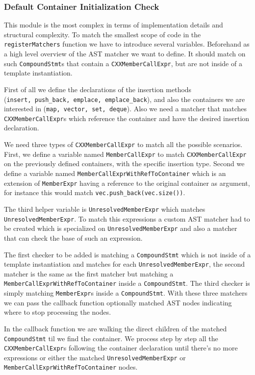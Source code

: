 \subsubsection{Default Container Initialization Check}
\par This module is the most complex in terms of implementation details and structural complexity. To match the smallest scope of code in the \verb|registerMatchers| function we have to introduce several variables. Beforehand as a high level overview of the AST matcher we want to define. It should match on such \verb|CompoundStmt|s that contain a \verb|CXXMemberCallExpr|, but are not inside of a template instantiation. \medskip
\par First of all we define the declarations of the insertion methods \\(\verb|insert, push_back, emplace, emplace_back|), and also the containers we are interested in (\verb|map, vector, set, deque|). Also we need a matcher that matches \verb|CXXMemberCallExpr|s which reference the container and have the desired insertion declaration. \medskip
\par We need three types of \verb|CXXMemberCallExpr| to match all the possible scenarios. First, we define a variable named \verb|MemberCallExpr| to match \verb|CXXMemberCallExpr| on the previously defined containers, with the specific insertion type. Second we define a variable named \verb|MemberCallExprWithRefToContainer| which is an extension of \verb|MemberExpr| having a reference to the original container as argument, for instance this would match \verb|vec.push_back(vec.size())|. \medskip 
\par The third helper variable is \verb|UnresolvedMemberExpr| which matches \verb|UnresolvedMemberExpr|. To match this expressions a custom AST matcher had to be created which is specialized on \verb|UnresolvedMemberExpr| and also a matcher that can check the base of such an expression. \medskip
\par The first checker to be added is matching a \verb|CompoundStmt| which is not inside of a template instantiation and matches for each \verb|UnresolvedMemberExpr|, the second matcher is the same as the first matcher but matching a \verb|MemberCallExprWithRefToContainer| inside a \verb|CompoundStmt|. The third checker is simply matching \verb|MemberExpr|s inside a \verb|CompoundStmt|. With these three matchers we can pass the callback function optionally matched AST nodes indicating where to stop processing the nodes. \medskip
\par In the callback function we are walking the direct children of the matched \verb|CompoundStmt| til we find the container. We process step by step all the \verb|CXXMemberCallExpr|s following the container declaration until there's no more expressions or either the matched \verb|UnresolvedMemberExpr| or \verb|MemberCallExprWithRefToContainer| nodes. \medskip
